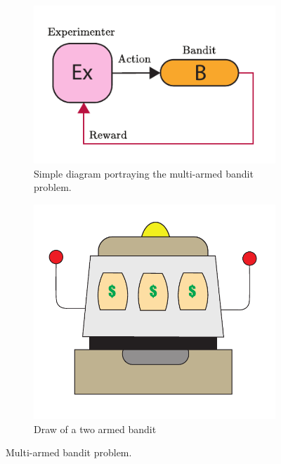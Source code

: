 \documentclass[11pt,a4paper,twoside]{report}
\newcommand{\+}{\textnormal{+} }
\theoremstyle{definition}
\numberwithin{equation}{chapter}
\begin{document}
\begin{figure}[t]
  \centering
  \begin{subfigure}{.5\textwidth}
    \centering
    \includegraphics[width=1\linewidth]{figures/Bandit.pdf}
    \caption{Simple diagram portraying the multi-armed bandit problem.}
  \end{subfigure}
  \begin{subfigure}{.5\textwidth}
    \centering
    \includegraphics[width=1\linewidth]{figures/Bandit-Draw.pdf}
    \caption{Draw of a two armed bandit}
  \end{subfigure}
  \caption{Multi-armed bandit problem.}
  \end{figure}
\end{document}
